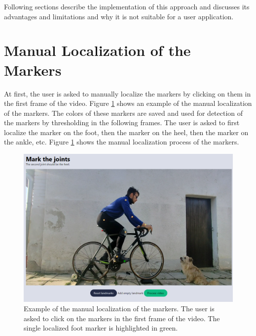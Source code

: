 Following sections describe the implementation of this approach and discusses its advantages and limitations and why it is not suitable for a user application.


\section{Manual Localization of the Markers}
\label{manual_localization_of_the_markers}
At first, the user is asked to manually localize the markers by clicking on them in the first frame of the video. Figure \ref{fig:marker_localization} shows an example of the manual localization of the markers. The colors of these markers are saved and used for detection of the markers by thresholding in the following frames. The user is asked to first localize the marker on the foot, then the marker on the heel, then the marker on the ankle, etc. Figure \ref{fig:marker_localization} shows the manual localization process of the markers.

\begin{figure}[htb]
    \centering
    \includegraphics[width=\textwidth]{obrazky-figures/markers_localization.png}
    \caption{Example of the manual localization of the markers. The user is asked to click on the markers in the first frame of the video. The single localized foot marker is highlighted in green.}
    \label{fig:marker_localization}
\end{figure}




